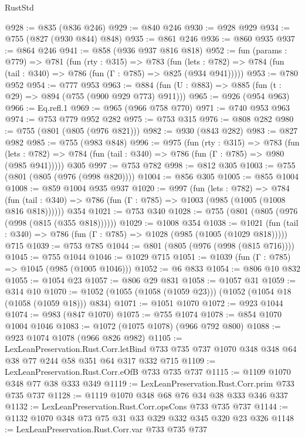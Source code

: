 \begin{lexlean}{RustStd}
\begin{coremodule}
{\begin{coremodule}
{{{{{@928 := @835 (@836 @246)
@929 := @840 @246
@930 := @928 @929
@934 := @755 (@827 (@930 @844) @848)
@935 := @861 @246
@936 := @860 @935
@937 := @864 @246
@941 := @858 (@936 @937 @816 @818)
@952 := fun (params : @779) =>
  @781
    (fun (rty : @315) =>
    @783
      (fun (lets : @782) => @784 (fun (tail : @340) => @786 (fun (Γ : @785) => @825 (@934 @941)))))
@953 := @780 @952
@954 := @777 @953
@963 := @884 (fun (U : @883) => @885 (fun (t : @29) => @894 (@755 (@900 @929 @773) @911)))
@965 := @926 (@954 @963)
@966 := Eq.refl.{1}
@969 := @965 (@966 @758 @770)
@971 := @740 @953 @963
@974 := @753 @779 @952 @282
@975 := @753 @315
@976 := @808 @282
@980 := @755 (@801 (@805 (@976 @821)))
@982 := @930 (@843 @282)
@983 := @827 @982
@985 := @755 (@983 @848)
@996 := @975
    (fun (rty : @315) =>
    @783
      (fun (lets : @782) => @784 (fun (tail : @340) => @786 (fun (Γ : @785) => @980 (@985 @941)))))
    @305
@997 := @753 @782
@998 := @812 @305
@1003 := @755 (@801 (@805 (@976 (@998 @820))))
@1004 := @856 @305
@1005 := @855 @1004
@1008 := @859 @1004 @935 @937
@1020 := @997
    (fun (lets : @782) =>
    @784 (fun (tail : @340) => @786 (fun (Γ : @785) => @1003 (@985 (@1005 (@1008 @816 @818))))))
    @354
@1021 := @753 @340
@1028 := @755 (@801 (@805 (@976 (@998 (@815 (@355 @818))))))
@1029 := @1008 @354
@1038 := @1021
    (fun (tail : @340) => @786 (fun (Γ : @785) => @1028 (@985 (@1005 (@1029 @818)))))
    @715
@1039 := @753 @785
@1044 := @801 (@805 (@976 (@998 (@815 @716))))
@1045 := @755 @1044
@1046 := @1029 @715
@1051 := @1039 (fun (Γ : @785) => @1045 (@985 (@1005 @1046)))
@1052 := @6 @833
@1054 := @806 @10 @832
@1055 := @1054 @23
@1057 := @806 @29 @831
@1058 := @1057 @31
@1059 := @314 @10
@1070 := @1052 (@1055 (@1058 (@1059 @23))) (@1052 (@1054 @18 (@1058 (@1059 @18))) @834)
@1071 := @1051 @1070
@1072 := @923 @1044
@1074 := @983 (@847 @1070)
@1075 := @755 @1074
@1078 := @854 @1070 @1004 @1046
@1083 := @1072 (@1075 @1078) (@966 @792 @800)
@1088 := @923 @1074 @1078 (@966 @826 @982)
@1105 := LexLeanPreservation.Rust.Corr.letBind
    @733
    @735
    @737
    @1070
    @348
    @348
    @64
    @38
    @77
    @244
    @58
    @351
    @64
    @317
    @332
    @715
@1109 := LexLeanPreservation.Rust.Corr.eOfB @733 @735 @737
@1115 := @1109 @1070 @348 @77 @38 @333 @349
@1119 := LexLeanPreservation.Rust.Corr.prim @733 @735 @737
@1128 := @1119 @1070 @348 @68 @76 @34 @38 @333 @346 @337
@1132 := LexLeanPreservation.Rust.Corr.opsCons @733 @735 @737
@1144 := @1132 @1070 @348 @73 @75 @31 @33 @329 @332 @345 @320 @23 @326
@1148 := LexLeanPreservation.Rust.Corr.var @733 @735 @737
}}}}}
\end{coremodule}}
\end{coremodule}
\end{lexlean}
